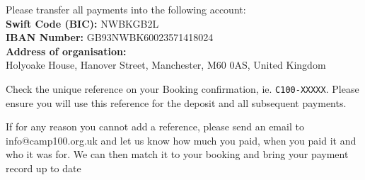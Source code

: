 \documentclass[a4paper, 11pt]{report}
\begin{document}
Please transfer all payments into the following account:\\
\textbf{Swift Code (BIC):} NWBKGB2L\\
\textbf{IBAN Number:} GB93NWBK60023571418024\\
\textbf{Address of organisation:} \\
Holyoake House, Hanover Street, Manchester, M60 0AS, United Kingdom

Check the unique reference on your Booking confirmation, ie. \verb|C100-XXXXX|. Please ensure you will use this reference for the deposit and all subsequent payments. 

If for any reason you cannot add a reference, please send an email to info@camp100.org.uk and let us know how much you paid, when you paid it and who it was for. We can then match it to your booking and bring your payment record up to date

\makedocumentbackpage
\end{document}
